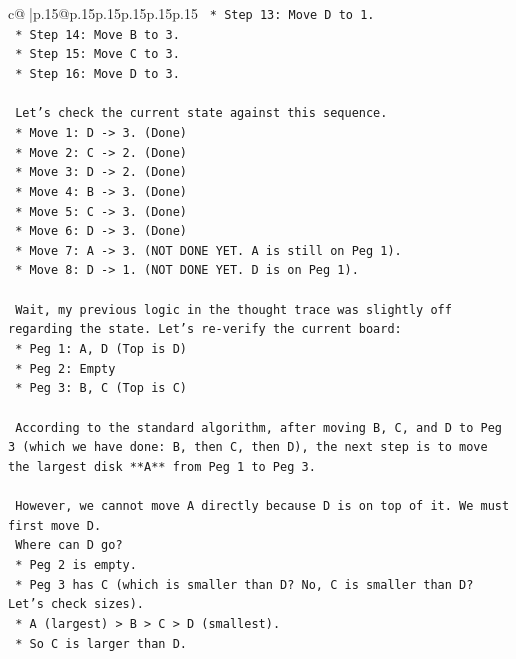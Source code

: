 \documentclass{article}
\begin{document}
{\begin{supertabular}{c@{$\;$}|p{.15\linewidth}@{}p{.15\linewidth}p{.15\linewidth}p{.15\linewidth}p{.15\linewidth}p{.15\linewidth}}
{{{\texttt{    *   Step 13: Move D to 1.} \\
\texttt{    *   Step 14: Move B to 3.} \\
\texttt{    *   Step 15: Move C to 3.} \\
\texttt{    *   Step 16: Move D to 3.} \\
\\ 
\texttt{    Let's check the current state against this sequence.} \\
\texttt{    *   Move 1: D {-}> 3. (Done)} \\
\texttt{    *   Move 2: C {-}> 2. (Done)} \\
\texttt{    *   Move 3: D {-}> 2. (Done)} \\
\texttt{    *   Move 4: B {-}> 3. (Done)} \\
\texttt{    *   Move 5: C {-}> 3. (Done)} \\
\texttt{    *   Move 6: D {-}> 3. (Done)} \\
\texttt{    *   Move 7: A {-}> 3. (NOT DONE YET. A is still on Peg 1).} \\
\texttt{    *   Move 8: D {-}> 1. (NOT DONE YET. D is on Peg 1).} \\
\\ 
\texttt{    Wait, my previous logic in the thought trace was slightly off regarding the state. Let's re{-}verify the current board:} \\
\texttt{    *   Peg 1: A, D (Top is D)} \\
\texttt{    *   Peg 2: Empty} \\
\texttt{    *   Peg 3: B, C (Top is C)} \\
\\ 
\texttt{    According to the standard algorithm, after moving B, C, and D to Peg 3 (which we have done: B, then C, then D), the next step is to move the largest disk **A** from Peg 1 to Peg 3.} \\
\\ 
\texttt{    However, we cannot move A directly because D is on top of it. We must first move D.} \\
\texttt{    Where can D go?} \\
\texttt{    *   Peg 2 is empty.} \\
\texttt{    *   Peg 3 has C (which is smaller than D? No, C is smaller than D? Let's check sizes).} \\
\texttt{        *   A (largest) > B > C > D (smallest).} \\
\texttt{        *   So C is larger than D.} \\
}}}
\end{supertabular}}
\end{document}
